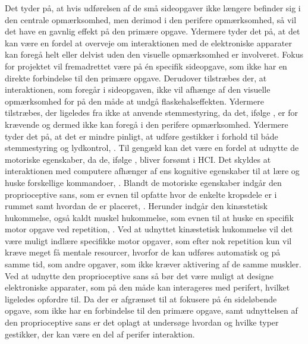 Det tyder på, at hvis udførelsen af de små sideopgaver ikke længere befinder sig i den centrale opmærksomhed, men derimod i den perifere opmærksomhed, så vil det have en gavnlig effekt på den primære opgave. Ydermere tyder det på, at det kan være en fordel at overveje om interaktionen med de elektroniske apparater kan foregå helt eller delvist uden den visuelle opmærksomhed er involveret. Fokus for projektet vil fremadrettet være på én specifik sideopgave, som ikke har en direkte forbindelse til den primære opgave. Derudover tilstræbes der, at interaktionen, som foregår i sideopgaven, ikke vil afhænge af den visuelle opmærksomhed for på den måde at undgå flaskehalseffekten. Ydermere tilstræbes, der ligeledes fra ikke at anvende stemmestyring, da det, ifølge \textcite[s. 41]{PDF:PIEmbeddingHCIMicroManageMe}, er for krævende og dermed ikke kan foregå i den perifere opmærksomhed. Ydermere tyder det på, at det er mindre pinligt, at udføre gestikker i forhold til både stemmestyring og lydkontrol, \parencite[s. 4]{PDF:AnExploratoryStudy}. Til gengæld kan det være en fordel at udnytte de motoriske egenskaber, da de, ifølge \textcite[s. 187]{PDF:PIDesktopComputingKap9}, bliver forsømt i HCI. Det skyldes at interaktionen med computere afhænger af ens kognitive egenskaber til at lære og huske forskellige kommandoer, \parencite[s. 187]{PDF:PIDesktopComputingKap9}. Blandt de motoriske egenskaber indgår den proprioceptive sans, som er evnen til opfatte hvor de enkelte kropsdele er i rummet samt hvordan de er placeret, \parencite[s. 193]{PDF:PIDesktopComputingKap9}. Herunder indgår den kinæstetisk hukommelse, også kaldt muskel hukommelse, som evnen til at huske en specifik motor opgave ved repetition, \parencite[s. 193]{PDF:PIDesktopComputingKap9}. Ved at udnyttet kinæstetisk hukommelse vil det være muligt indlære specifikke motor opgaver, som efter nok repetition kun vil kræve meget få mentale resourcer, hvorfor de kan udføres automatisk og på samme tid, som andre opgaver, som ikke kræver aktivering af de samme muskler. Ved at udnytte den proprioceptive sans så bør det være muligt at designe elektroniske apparater, som på den måde kan interageres med perifert, hvilket \textcite[s. 202]{PDF:PIDesktopComputingKap9} ligeledes opfordre til.\blankline
%
Da der er afgrænset til at fokusere på én sideløbende opgave, som ikke har en forbindelse til den primære opgave, samt udnyttelsen af den proprioceptive sans er det oplagt at undersøge hvordan og hvilke typer gestikker, der kan være en del af perifer interaktion.      
 